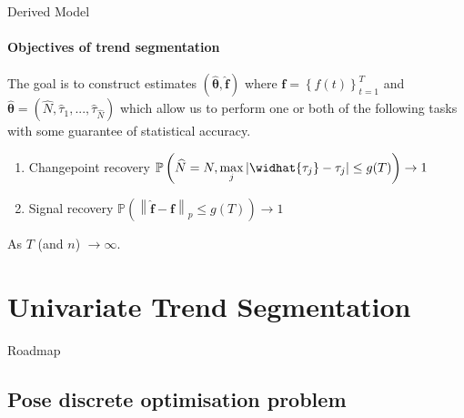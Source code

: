 \documentclass{beamer}
\begin{document}

\begin{frame}{Derived Model}
\framesubtitle{Objectives of trend segmentation}

The goal is to construct estimates $\left ( \boldsymbol{\widehat{\theta}}, \boldsymbol{\widehat{f}} \right )$ where $\boldsymbol{f} = \left \{ f(t) \right \}_{t=1}^T$ and  $\boldsymbol{\widehat{\theta}} = \left ( \widehat{N}, \widehat{\tau}_1, ..., \widehat{\tau}_{\widehat{N}} \right )$ which allow us to perform one or both of the following tasks with some guarantee of statistical accuracy.

\bigskip

\begin{enumerate}
    \item Changepoint recovery $\mathbb{P} \left ( \widehat{N} = N, \underset{j}{\max} \left | \widhat{\tau_j} - \tau_j \right | \leq g(T) \right ) \rightarrow 1 $
    \item Signal recovery $\mathbb{P} \left ( \left \| \boldsymbol{\widehat{f} - f} \right \|_p \leq g(T) \right ) \rightarrow 1 $
\end{enumerate}

\bigskip

As $T$ (and $n$) $\rightarrow \infty$.

\end{frame}






\section{Univariate Trend Segmentation}




\begin{frame}{Roadmap}
\tableofcontents[currentsection]
\end{frame}



\subsection{Pose discrete optimisation problem}
\end{document}
